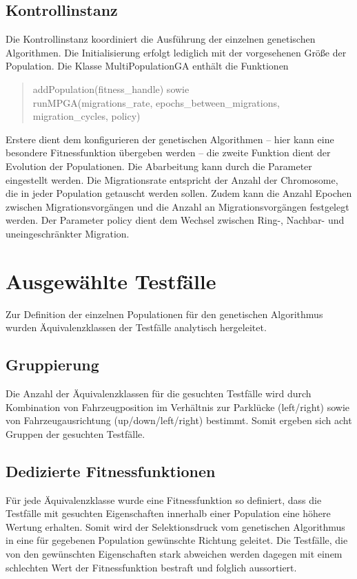\documentclass[12pt,a4paper]{article}
\begin{document}
\subsection{Kontrollinstanz}
Die Kontrollinstanz koordiniert die Ausführung der einzelnen genetischen Algorithmen. Die Initialisierung erfolgt lediglich mit der vorgesehenen Größe der Population. Die Klasse \textsf{MultiPopulationGA} enthält die Funktionen
\begin{quote}
\textsf{addPopulation(fitness\_handle)} sowie \\
\textsf{runMPGA(migrations\_rate, epochs\_between\_migrations, migration\_cycles, policy)}
\end{quote}
Erstere dient dem konfigurieren der genetischen Algorithmen -- hier kann eine besondere Fitnessfunktion übergeben werden -- die zweite Funktion dient der Evolution der Populationen. Die Abarbeitung kann durch die Parameter eingestellt werden. Die Migrationsrate entspricht der Anzahl der Chromosome, die in jeder Population getauscht werden sollen. Zudem kann die Anzahl Epochen zwischen Migrationsvorgängen und die Anzahl an Migrationsvorgängen festgelegt werden. Der Parameter \textsf{policy} dient dem Wechsel zwischen Ring-, Nachbar- und uneingeschränkter Migration.

\section{Ausgewählte Testfälle}
Zur Definition der einzelnen Populationen für den genetischen Algorithmus wurden Äquivalenzklassen der Testfälle analytisch hergeleitet.
\subsection{Gruppierung}
Die Anzahl der Äquivalenzklassen für die gesuchten Testfälle wird durch Kombination von Fahrzeugposition im Verhältnis zur Parklücke (left/right) sowie von Fahrzeugausrichtung (up/down/left/right) bestimmt. Somit ergeben sich acht Gruppen der gesuchten Testfälle.
\subsection{Dedizierte Fitnessfunktionen}
Für jede Äquivalenzklasse wurde eine Fitnessfunktion so definiert, dass die Testfälle mit gesuchten Eigenschaften innerhalb einer Population eine höhere Wertung erhalten. Somit wird der Selektionsdruck vom genetischen Algorithmus in eine für gegebenen Population gewünschte Richtung geleitet. Die Testfälle, die von den gewünschten Eigenschaften stark abweichen werden dagegen mit einem schlechten Wert der Fitnessfunktion bestraft und folglich aussortiert.
\end{document}
